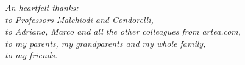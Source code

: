 \documentclass[\main/main.tex]{subfiles}
\begin{document}
\begin{flushright}
\emph{An heartfelt thanks:\\
to Professors Malchiodi and Condorelli, \\
to Adriano, Marco and all the other colleagues from artea.com, \\
to my parents, my grandparents and my whole family, \\
to my friends.}
\end{flushright}
\end{document}
